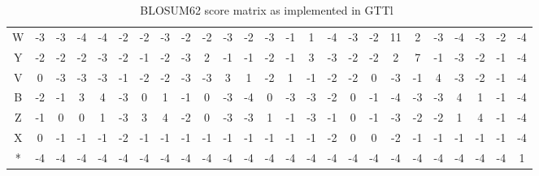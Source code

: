 \documentclass[twoside,a4paper,bsc]{master}
\begin{document}
\begin{table}
\begin{tabular}{c|cccccccccccccccccccccccc}
W & -3&-3&-4&-4&-2&-2&-3&-2&-2&-3&-2&-3&-1&1& -4&-3&-2&11&2& -3&-4&-3&-2&-4\\
Y & -2&-2&-2&-3&-2&-1&-2&-3&2& -1&-1&-2&-1&3& -3&-2&-2&2& 7& -1&-3&-2&-1&-4 \\
V & 0&-3&-3&-3&-1&-2&-2&-3&-3&3& 1& -2&1&-1&-2&-2&0& -3&-1&4& -3&-2&-1&-4\\
B & -2&-1&3& 4&-3&0& 1& -1&0&-3&-4&0&-3&-3&-2&0&-1&-4&-3&-3&4&1& -1&-4 \\
Z & -1&0& 0& 1&-3&3& 4& -2&0&-3&-3&1&-1&-3&-1&0&-1&-3&-2&-2&1&4& -1&-4 \\
X & 0& -1&-1&-1&-2&-1&-1&-1&-1&-1&-1&-1&-1&-1&-2&0& 0& -2&-1&-1&-1&-1&-1&-4 \\
* & -4&-4&-4&-4&-4&-4&-4&-4&-4&-4&-4&-4&-4&-4&-4&-4&-4&-4&-4&-4&-4&-4&-4&1 \\
\end{tabular}
\caption{BLOSUM62 score matrix as implemented in GTTl~\cite{gttl}}\label{tab:blosum62}
\end{table}
\restoregeometry

\Assertion
\end{document}
